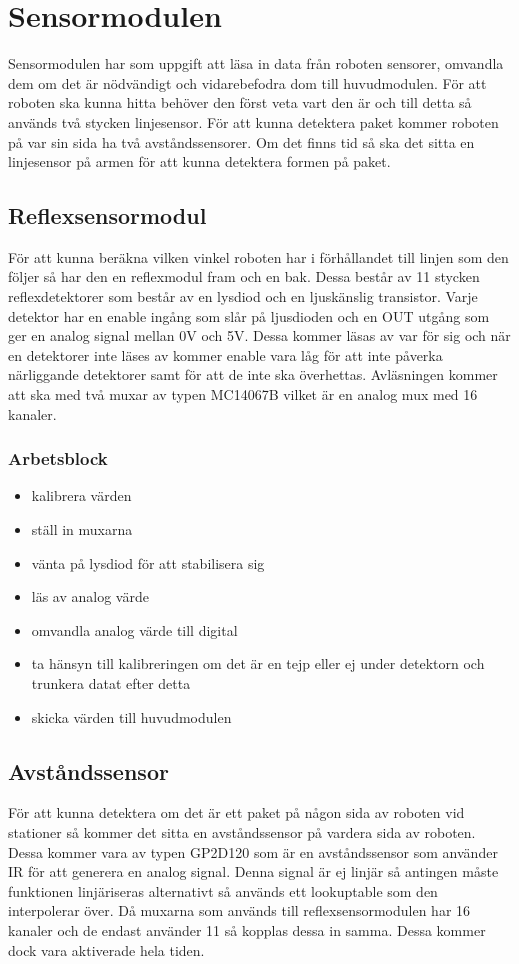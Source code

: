 %

\section{Sensormodulen}
Sensormodulen har som uppgift att läsa in data från roboten sensorer, omvandla dem om det är nödvändigt och vidarebefodra dom till huvudmodulen. För att roboten ska kunna hitta behöver den först veta vart den är och till detta så används två stycken linjesensor. För att kunna detektera paket kommer roboten på var sin sida ha två avståndssensorer. Om det finns tid så ska det sitta en linjesensor på armen för att kunna detektera formen på paket.

\subsection{Reflexsensormodul}
För att kunna beräkna vilken vinkel roboten har i förhållandet till linjen som den följer så har den en reflexmodul fram och en bak. Dessa består av 11 stycken reflexdetektorer som består av en lysdiod och en ljuskänslig transistor. Varje detektor har en enable ingång som slår på ljusdioden och en OUT utgång som ger en analog signal mellan 0V och 5V. Dessa kommer läsas av var för sig och när en detektorer inte läses av kommer enable vara låg för att inte påverka närliggande detektorer samt för att de inte ska överhettas. Avläsningen kommer att ska med två muxar av typen MC14067B vilket är en analog mux med 16 kanaler.
\subsubsection{Arbetsblock}
\begin{itemize}
\item kalibrera värden
\item ställ in muxarna
\item vänta på lysdiod för att stabilisera sig
\item läs av analog värde
\item omvandla analog värde till digital
\item ta hänsyn till kalibreringen om det är en tejp eller ej under detektorn och trunkera datat efter detta
\item skicka värden till huvudmodulen
\end{itemize}
\subsection{Avståndssensor}
För att kunna detektera om det är ett paket på någon sida av roboten vid stationer så kommer det sitta en avståndssensor på vardera sida av roboten. Dessa kommer vara av typen GP2D120 som är en avståndssensor som använder IR för att generera en analog signal. Denna signal är ej linjär så antingen måste funktionen linjäriseras alternativt så används ett lookuptable som den interpolerar över. Då muxarna som används till reflexsensormodulen har 16 kanaler och de endast använder 11 så kopplas dessa in samma. Dessa kommer dock vara aktiverade hela tiden.
